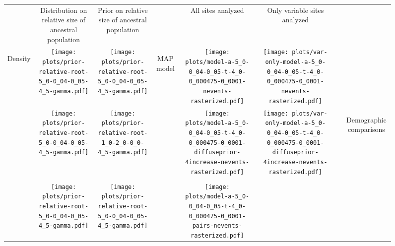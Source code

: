 \documentclass[border=10pt,varwidth=30cm]{standalone}
\begin{document}
\begin{figure}
    \setlength\arrayrulewidth{2pt}
    \centering
    \begin{tabular}{@{}cccccccc@{}}
        & \multirow{1}{0.15\textwidth}{\centering\Large Distribution on relative size of ancestral population}
        & \multirow{1}{0.15\textwidth}{\centering\Large Prior on relative size of ancestral population}
        &
        & \multirow{1}{0.15\textwidth}{\centering\Large All sites analyzed}
        & \multirow{1}{0.15\textwidth}{\centering\Large Only variable sites analyzed}
        & 
        & \\[9ex]
        \multirow{5}{*}[-8em]{\begin{sideways}\large Density\end{sideways}}
        & \texttt{[image: plots/prior-relative-root-5\_0-0\_04-0\_05-4\_5-gamma.pdf]}
        & \texttt{[image: plots/prior-relative-root-5\_0-0\_04-0\_05-4\_5-gamma.pdf]}
        & \multirow{5}{*}[-6em]{\begin{sideways}\large MAP model\end{sideways}}
        & \texttt{[image: plots/model-a-5\_0-0\_04-0\_05-t-4\_0-0\_000475-0\_0001-nevents-rasterized.pdf]}
        & \texttt{[image: plots/var-only-model-a-5\_0-0\_04-0\_05-t-4\_0-0\_000475-0\_0001-nevents-rasterized.pdf]} 
        & \multicolumn{1}{c|}{} 
        & \\
        & \texttt{[image: plots/prior-relative-root-5\_0-0\_04-0\_05-4\_5-gamma.pdf]}
        & \texttt{[image: plots/prior-relative-root-1\_0-2\_0-0\_0-4\_5-gamma.pdf]}
        &
        & \texttt{[image: plots/model-a-5\_0-0\_04-0\_05-t-4\_0-0\_000475-0\_0001-diffuseprior-4increase-nevents-rasterized.pdf]}
        & \texttt{[image: plots/var-only-model-a-5\_0-0\_04-0\_05-t-4\_0-0\_000475-0\_0001-diffuseprior-4increase-nevents-rasterized.pdf]}
        & \multicolumn{1}{c|}{} 
        & \multirow{5}{*}[17em]{\begin{sideways}\Large Demographic comparisons\end{sideways}} \\
        & & & & & & & \\
        & \texttt{[image: plots/prior-relative-root-5\_0-0\_04-0\_05-4\_5-gamma.pdf]}
        & \texttt{[image: plots/prior-relative-root-5\_0-0\_04-0\_05-4\_5-gamma.pdf]}
        &
        & \texttt{[image: plots/model-a-5\_0-0\_04-0\_05-t-4\_0-0\_000475-0\_0001-pairs-nevents-rasterized.pdf]}

\end{tabular}
\end{figure}
\end{document}
